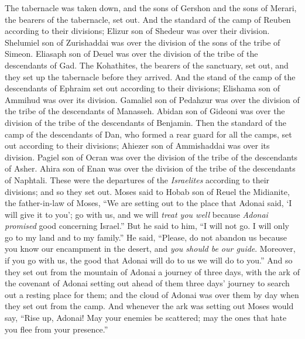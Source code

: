 \begin{biblechapter}
\verse The tabernacle was taken down, and the sons of Gershon and the sons of Merari, the bearers of the tabernacle, set out.
\verse And the standard of the camp of Reuben according to their divisions; Elizur son of Shedeur was over their division.
\verse Shelumiel son of Zurishaddai was over the division of the sons of the tribe of Simeon.
\verse Eliasaph son of Deuel was over the division of the tribe of the descendants of Gad.
\verse The Kohathites, the bearers of the sanctuary, set out, and they set up the tabernacle before they arrived.
\verse And the stand of the camp of the descendants of Ephraim set out according to their divisions; Elishama son of Ammihud was over its division.
\verse Gamaliel son of Pedahzur was over the division of the tribe of the descendants of Manasseh.
\verse Abidan son of Gideoni was over the division of the tribe of the descendants of Benjamin.
\verse Then the standard of the camp of the descendants of Dan, who formed a rear guard for all the camps, set out according to their divisions; Ahiezer son of Ammishaddai was over its division.
\verse Pagiel son of Ocran was over the division of the tribe of the descendants of Asher.
\verse Ahira son of Enan was over the division of the tribe of the descendants of Naphtali.
\verse These were the departures of the \textit{Israelites} according to their divisions; and so they set out.
\verse Moses said to Hobab son of Reuel the Midianite, the father-in-law of Moses, “We are setting out to the place that Adonai said, ‘I will give it to you’; go with us, and we will \textit{treat you well} because \textit{Adonai promised} good concerning Israel.”
\verse But he said to him, “I will not go. I will only go to my land and to my family.”
\verse He said, “Please, do not abandon us because you know our encampment in the desert, and \textit{you should be our guide}.
\verse Moreover, if you go with us, the good that Adonai will do to us we will do to you.”
\verse And so they set out from the mountain of Adonai a journey of three days, with the ark of the covenant of Adonai setting out ahead of them three days’ journey to search out a resting place for them;
\verse and the cloud of Adonai was over them by day when they set out from the camp.
\verse And whenever the ark was setting out Moses would say,
\verse “Rise up, Adonai! 
May your enemies be scattered; 
may the ones that hate you flee from your presence.”
\end{biblechapter}

